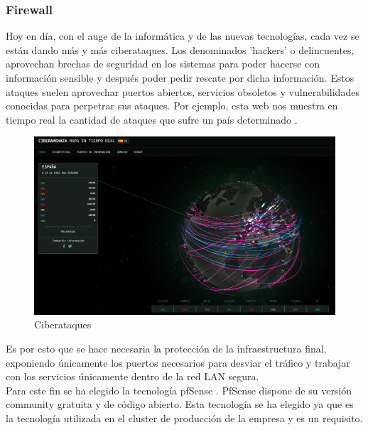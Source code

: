 \subsubsection{Firewall}
\begin{text}
	Hoy en día, con el auge de la informática y de las nuevas tecnologías, cada vez se están dando más y más ciberataques. Los denominados 'hackers' o delincuentes, aprovechan brechas de seguridad en los sistemas para poder hacerse con información sensible y después poder pedir rescate por dicha información. Estos ataques suelen aprovechar puertos abiertos, servicios obsoletos y vulnerabilidades conocidas para perpetrar sus ataques. Por ejemplo, esta web nos muestra en tiempo real la cantidad de ataques que sufre un país determinado \cite{ciberataques:online}.
	\begin{figure}[!hbt]
		\centering
		\includegraphics[scale=0.3]{imagenes/Diseno/ciberataques.png}
		\caption[Ciberataques]{Ciberataques \cite{ciberataques:online}} 
		\label{Ciberataques}
	\end{figure}
	Es por esto que se hace necesaria la protección de la infraestructura final, exponiendo únicamente los puertos necesarios para desviar el tráfico y trabajar con los servicios únicamente dentro de la red LAN segura. \\
	Para este fin se ha elegido la tecnología pfSense \cite{pfsense:online}. PfSense dispone de su versión community gratuita y de código abierto. Esta tecnología se ha elegido ya que es la tecnología utilizada en el cluster de producción de la empresa y es un requisito.
\end{text}


